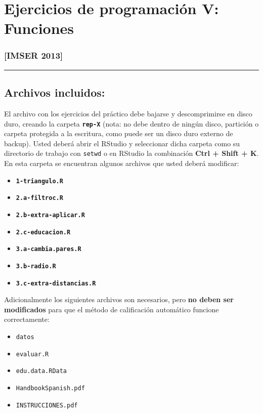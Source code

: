 \documentclass[]{article}
\author{}
\date{}
\begin{document}
\section{Ejercicios de programación V: Funciones}

\subsubsection{{[}IMSER 2013{]}}

\begin{center}\rule{3in}{0.4pt}\end{center}

\subsection{Archivos incluidos:}

El archivo con los ejercicios del práctico debe bajarse y descomprimirse
en disco duro, creando la carpeta \textbf{\texttt{rep-X}} (nota: no debe
dentro de ningún disco, partición o carpeta protegida a la escritura,
como puede ser un disco duro externo de backup). Usted deberá abrir el
RStudio y seleccionar dicha carpeta como su directorio de trabajo con
\texttt{setwd} o en RStudio la combinación \textbf{Ctrl + Shift + K}. En
esta carpeta se encuentran algunos archivos que usted deberá modificar:

\begin{itemize}
\item
  \textbf{\texttt{1-triangulo.R}}
\item
  \textbf{\texttt{2.a-filtroc.R}}
\item
  \textbf{\texttt{2.b-extra-aplicar.R}}
\item
  \textbf{\texttt{2.c-educacion.R}}
\item
  \textbf{\texttt{3.a-cambia.pares.R}}
\item
  \textbf{\texttt{3.b-radio.R}}
\item
  \textbf{\texttt{3.c-extra-distancias.R}}
\end{itemize}

Adicionalmente los siguientes archivos son necesarios, pero \textbf{no
deben ser modificados} para que el método de calificación automático
funcione correctamente:

\begin{itemize}
\item
  \texttt{datos}
\item
  \texttt{evaluar.R}
\item
  \texttt{edu.data.RData}
\item
  \texttt{HandbookSpanish.pdf}
\item
  \texttt{INSTRUCCIONES.pdf}
\end{itemize}
\end{document}
